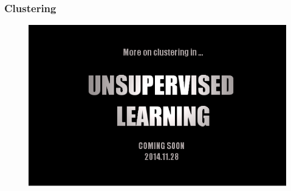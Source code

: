 \documentclass[table]{beamer}
\begin{document}
{
	\frametitle{Clustering}
	\begin{figure}
		\includegraphics[scale=0.45]{fig/ulcs3.png}		
	\end{figure}
}

\end{document}
